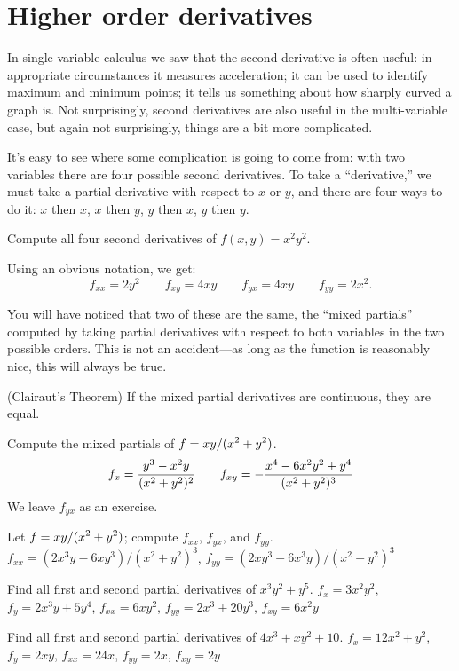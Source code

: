 \section{Higher order derivatives}{}{}

In single variable calculus we saw that the second derivative is often
useful: in appropriate circumstances it measures acceleration; it can
be used to identify maximum and minimum points; it tells us something
about how sharply curved a graph is. Not surprisingly, second
derivatives are also useful in the multi-variable case, but again not
surprisingly, things are a bit more complicated.

It's easy to see where some complication is going to come from: with
two variables there are four possible second derivatives. To take a
``derivative,'' we must take a partial derivative with respect to $x$
or $y$, and there are four ways to do it: $x$ then $x$, $x$ then $y$, 
$y$ then $x$, $y$ then $y$.

\example Compute all four second derivatives of $f(x,y)=x^2y^2$.

Using an obvious notation, we get:
$$f_{xx}=2y^2\qquad f_{xy}=4xy\qquad f_{yx}=4xy\qquad f_{yy}=2x^2.$$
\endexample

You will have noticed that two of these are the same, the ``mixed
partials'' computed by taking partial derivatives with respect to both
variables in the two possible orders. This is not an accident---as
long as the function is reasonably nice, this will always be true.

\thm (Clairaut's Theorem) If the mixed partial derivatives are
continuous, they are equal.
\endthmnoproof
{}

\example Compute the mixed partials of $\displaystyle f=xy/(x^2+y^2)$.
$$
f_x={y^3-x^2y\over(x^2+y^2)^2}\qquad
f_{xy}=-{x^4-6x^2y^2+y^4\over (x^2+y^2)^3}
$$
We leave $f_{yx}$ as an exercise.
\endexample

\exercises

\exercise Let $\displaystyle f=xy/(x^2+y^2)$; compute $f_{xx}$, $f_{yx}$, and $f_{yy}$.
\answer $f_{xx}=(2x^3y-6xy^3)/(x^2+y^2)^3$,
$f_{yy}=(2xy^3-6x^3y)/(x^2+y^2)^3$
\endanswer
\endexercise

\exercise Find all first and second partial derivatives of
$x^3y^2+y^5$.
\answer $f_x=3x^2y^2$, $f_y=2x^3y+5y^4$, 
$f_{xx}=6xy^2$, $f_{yy}=2x^3+20y^3$, $f_{xy}=6x^2y$
\endanswer
\endexercise

\exercise Find all first and second partial derivatives of
$4x^3+xy^2+10$.
\answer $f_x=12x^2+y^2$, $f_y=2xy$, \hfill\break 
$f_{xx}=24x$, $f_{yy}=2x$, $f_{xy}=2y$
\endanswer
\endexercise

